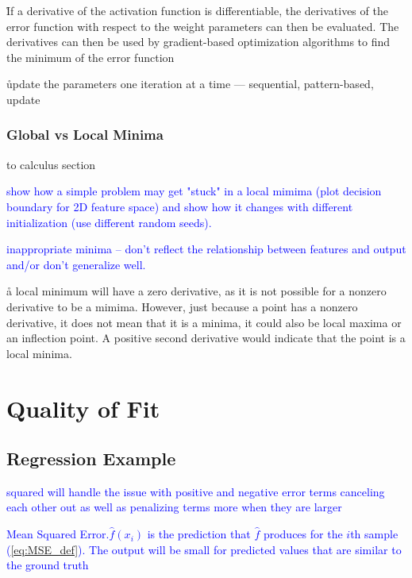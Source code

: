 \r{If a derivative of the activation function is differentiable, the derivatives of the error function with respect to the weight parameters can then be evaluated. The derivatives can then be used by gradient-based optimization algorithms to find the minimum of the error function }

\r{update the parameters one iteration at a time --- sequential, pattern-based, update}



\subsubsection{Global vs Local Minima}

\ALR to calculus section

\textcolor{blue}{show how a simple problem may get "stuck" in a local mimima (plot decision boundary for 2D feature space) and show how it changes with different initialization (use different random seeds). }

\textcolor{blue}{{inappropriate minima} -- don't reflect the relationship between features and output and/or don't generalize well.}

\r{a local minimum will have a zero derivative, as it is not possible for a nonzero derivative to be a mimima.  However, just because a point has a nonzero derivative, it does not mean that it is a minima, it could also be local maxima or an inflection point. A positive second derivative would indicate that the point is a local minima.}

\section{Quality of Fit}


\subsection{Regression Example}


\textcolor{blue}{squared will handle the issue with positive and negative error terms canceling each other out as well as penalizing terms more when they are larger}

\textcolor{blue}{Mean Squared Error.$\hat{f}(x_i)$ is the prediction that $\hat{f}$ produces for the $i$th sample (\ref{eq:MSE_def}). The output will be small for predicted values that are similar to the ground truth}

